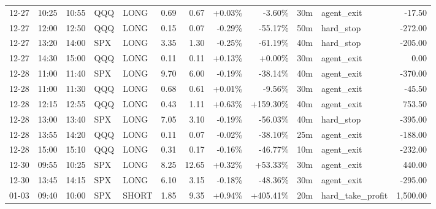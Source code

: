 \documentclass[11pt,a4paper,twoside]{article}
\begin{document}
\begin{center}
\begin{longtable}{>{\color{txtmain}}l l l l l r r r r r >{\color{txtmain}}l r}
12-27 & 10:25 & 10:55 & QQQ & LONG & 0.69 & 0.67 & \textcolor{wingreen}{+0.03\%} & \textcolor{lossred}{-3.60\%} & 30m & agent\_exit & \textcolor{lossred}{-17.50} \\
12-27 & 12:00 & 12:50 & QQQ & LONG & 0.15 & 0.07 & \textcolor{lossred}{-0.29\%} & \textcolor{lossred}{-55.17\%} & 50m & hard\_stop & \textcolor{lossred}{-272.00} \\
12-27 & 13:20 & 14:00 & SPX & LONG & 3.35 & 1.30 & \textcolor{lossred}{-0.25\%} & \textcolor{lossred}{-61.19\%} & 40m & hard\_stop & \textcolor{lossred}{-205.00} \\
12-27 & 14:30 & 15:00 & QQQ & LONG & 0.11 & 0.11 & \textcolor{wingreen}{+0.13\%} & \textcolor{wingreen}{+0.00\%} & 30m & agent\_exit & \textcolor{wingreen}{0.00} \\
12-28 & 11:00 & 11:40 & SPX & LONG & 9.70 & 6.00 & \textcolor{lossred}{-0.19\%} & \textcolor{lossred}{-38.14\%} & 40m & agent\_exit & \textcolor{lossred}{-370.00} \\
12-28 & 11:00 & 11:30 & QQQ & LONG & 0.68 & 0.61 & \textcolor{wingreen}{+0.01\%} & \textcolor{lossred}{-9.56\%} & 30m & agent\_exit & \textcolor{lossred}{-45.50} \\
12-28 & 12:15 & 12:55 & QQQ & LONG & 0.43 & 1.11 & \textcolor{wingreen}{+0.63\%} & \textcolor{wingreen}{+159.30\%} & 40m & agent\_exit & \textcolor{wingreen}{753.50} \\
12-28 & 13:00 & 13:40 & SPX & LONG & 7.05 & 3.10 & \textcolor{lossred}{-0.19\%} & \textcolor{lossred}{-56.03\%} & 40m & hard\_stop & \textcolor{lossred}{-395.00} \\
12-28 & 13:55 & 14:20 & QQQ & LONG & 0.11 & 0.07 & \textcolor{lossred}{-0.02\%} & \textcolor{lossred}{-38.10\%} & 25m & agent\_exit & \textcolor{lossred}{-188.00} \\
12-28 & 15:00 & 15:10 & QQQ & LONG & 0.31 & 0.17 & \textcolor{lossred}{-0.16\%} & \textcolor{lossred}{-46.77\%} & 10m & agent\_exit & \textcolor{lossred}{-232.00} \\
12-30 & 09:55 & 10:25 & SPX & LONG & 8.25 & 12.65 & \textcolor{wingreen}{+0.32\%} & \textcolor{wingreen}{+53.33\%} & 30m & agent\_exit & \textcolor{wingreen}{440.00} \\
12-30 & 13:45 & 14:15 & SPX & LONG & 6.10 & 3.15 & \textcolor{lossred}{-0.18\%} & \textcolor{lossred}{-48.36\%} & 30m & agent\_exit & \textcolor{lossred}{-295.00} \\
01-03 & 09:40 & 10:00 & SPX & SHORT & 1.85 & 9.35 & \textcolor{wingreen}{+0.94\%} & \textcolor{wingreen}{+405.41\%} & 20m & hard\_take\_profit & \textcolor{wingreen}{1,500.00} \\

\end{longtable}
\end{center}
\end{document}
